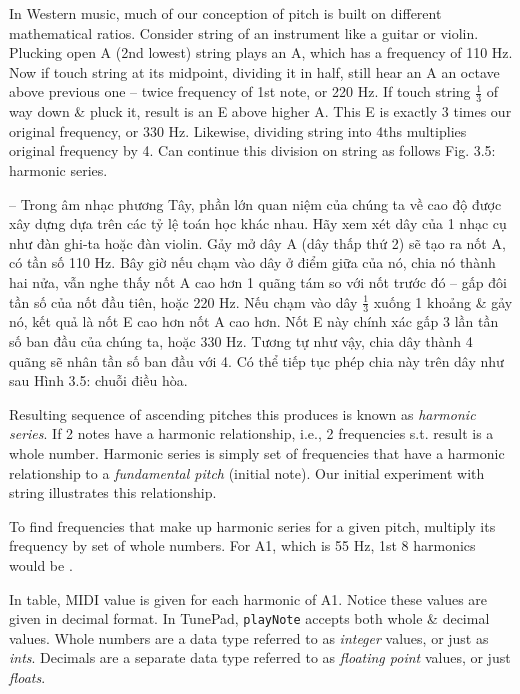 \documentclass{article}
\begin{document}
\begin{itemize}
\begin{itemize}
		In Western music, much of our conception of pitch is built on different mathematical ratios. Consider string of an instrument like a guitar or violin. Plucking open A (2nd lowest) string plays an A, which has a frequency of 110 Hz. Now if touch string at its midpoint, dividing it in half, still hear an A an octave above previous one -- twice frequency of 1st note, or 220 Hz. If touch string $\frac{1}{3}$ of way down \& pluck it, result is an E above higher A. This E is exactly 3 times our original frequency, or 330 Hz. Likewise, dividing string into 4ths multiplies original frequency by 4. Can continue this division on string as follows {\sf Fig. 3.5: harmonic series.}
		
		-- Trong âm nhạc phương Tây, phần lớn quan niệm của chúng ta về cao độ được xây dựng dựa trên các tỷ lệ toán học khác nhau. Hãy xem xét dây của 1 nhạc cụ như đàn ghi-ta hoặc đàn violin. Gảy mở dây A (dây thấp thứ 2) sẽ tạo ra nốt A, có tần số 110 Hz. Bây giờ nếu chạm vào dây ở điểm giữa của nó, chia nó thành hai nửa, vẫn nghe thấy nốt A cao hơn 1 quãng tám so với nốt trước đó -- gấp đôi tần số của nốt đầu tiên, hoặc 220 Hz. Nếu chạm vào dây $\frac{1}{3}$ xuống 1 khoảng \& gảy nó, kết quả là nốt E cao hơn nốt A cao hơn. Nốt E này chính xác gấp 3 lần tần số ban đầu của chúng ta, hoặc 330 Hz. Tương tự như vậy, chia dây thành 4 quãng sẽ nhân tần số ban đầu với 4. Có thể tiếp tục phép chia này trên dây như sau {\sf Hình 3.5: chuỗi điều hòa.}
		
		Resulting sequence of ascending pitches this produces is known as {\it harmonic series}. If 2 notes have a harmonic relationship, i.e., 2 frequencies s.t. result is a whole number. Harmonic series is simply set of frequencies that have a harmonic relationship to a {\it fundamental pitch} (initial note). Our initial experiment with string illustrates this relationship.
		
		To find frequencies that make up harmonic series for a given pitch, multiply its frequency by set of whole numbers. For A1, which is 55 Hz, 1st 8 harmonics would be {\sf[Table]}.
		
		In table, MIDI value is given for each harmonic of A1. Notice these values are given in decimal format. In TunePad, {\tt playNote} accepts both whole \& decimal values. Whole numbers are a data type referred to as {\it integer} values, or just as {\it ints}. Decimals are a separate data type referred to as {\it floating point} values, or just {\it floats}.
		

\end{itemize}
\end{itemize}
\end{document}
